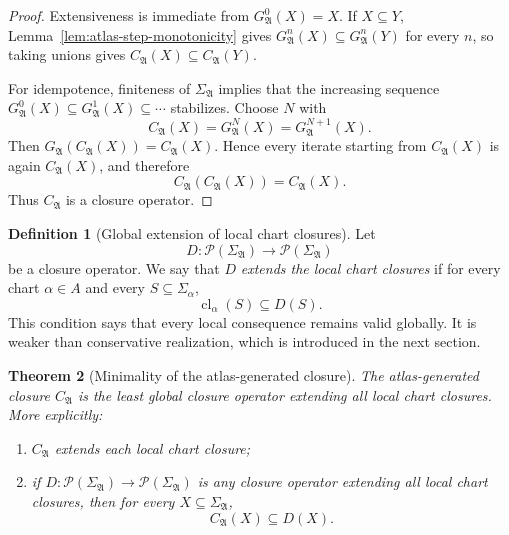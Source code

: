 \documentclass[11pt]{amsart}
\numberwithin{equation}{section}
\theoremstyle{plain}
\newtheorem{theorem}{Theorem}[section]
\theoremstyle{definition}
\newtheorem{definition}[theorem]{Definition}
\theoremstyle{remark}
\newcommand{\Pow}{\mathcal P}
\newcommand{\Cl}{\operatorname{cl}}
\newcommand{\A}{\mathfrak A}
\newcommand{\Sig}{\Sigma}
\newcommand{\CA}{C_{\mathfrak A}}
\newcommand{\GA}{G_{\mathfrak A}}
\begin{document}
\begin{proof}
Extensiveness is immediate from \(\GA^0(X)=X\).  If \(X\subseteq Y\), Lemma~\ref{lem:atlas-step-monotonicity} gives \(\GA^n(X)\subseteq\GA^n(Y)\) for every \(n\), so taking unions gives \(\CA(X)\subseteq\CA(Y)\).

For idempotence, finiteness of \(\Sig_{\A}\) implies that the increasing sequence \(\GA^0(X)\subseteq\GA^1(X)\subseteq\cdots\) stabilizes.  Choose \(N\) with
\[
  \CA(X)=\GA^N(X)=\GA^{N+1}(X).
\]
Then \(\GA(\CA(X))=\CA(X)\).  Hence every iterate starting from \(\CA(X)\) is again \(\CA(X)\), and therefore
\[
  \CA(\CA(X))=\CA(X).
\]
Thus \(\CA\) is a closure operator.
\end{proof}

\begin{definition}[Global extension of local chart closures]
\label{def:global-extension-chart-closures}
Let
\[
  D:\Pow(\Sig_{\A})\to\Pow(\Sig_{\A})
\]
be a closure operator. We say that \(D\) \emph{extends the local chart closures} if for every chart \(\alpha\in A\) and every \(S\subseteq\Sig_\alpha\),
\[
  \Cl_\alpha(S)\subseteq D(S).
\]
This condition says that every local consequence remains valid globally. It is weaker than conservative realization, which is introduced in the next section.
\end{definition}

\begin{theorem}[Minimality of the atlas-generated closure]
\label{thm:atlas-generated-closure-minimal}
The atlas-generated closure \(\CA\) is the least global closure operator extending all local chart closures. More explicitly:
\begin{enumerate}[label=\textup{(\roman*)}]
  \item \(\CA\) extends each local chart closure;
  \item if \(D:\Pow(\Sig_{\A})\to\Pow(\Sig_{\A})\) is any closure operator extending all local chart closures, then for every \(X\subseteq\Sig_{\A}\),
  \[
    \CA(X)\subseteq D(X).
  \]
\end{enumerate}
\end{theorem}
\end{document}
